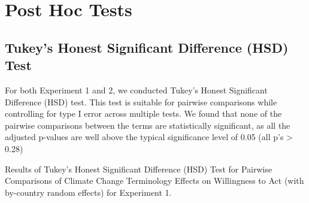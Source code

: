        \section{Post Hoc Tests}

    \subsection{Tukey’s Honest Significant Difference (HSD) Test}

For both Experiment 1 and 2, we conducted Tukey’s Honest Significant Difference (HSD) test. This test is suitable for pairwise comparisons while controlling for type I error across multiple tests. We found that none of the pairwise comparisons between the terms are statistically significant, as all the adjusted p-values are well above the typical significance level of 0.05 (all p’s > 0.28)

\begin{table}[H] 
\caption{Results of Tukey’s Honest Significant Difference (HSD) Test for Pairwise Comparisons of Climate Change Terminology Effects on Willingness to Act (with by-country random effects) for Experiment 1.}
 
\end{table}

